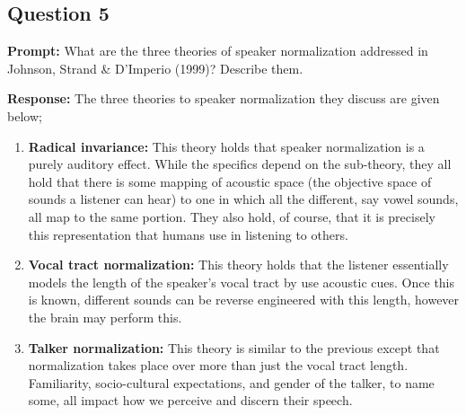 \documentclass{article}
\begin{document}
\subsection*{Question 5}
\noindent\textbf{Prompt:} What are the three theories of speaker normalization addressed in Johnson, Strand \& D'Imperio (1999)? Describe them.
\bigskip

\noindent\textbf{Response:} The three theories to speaker normalization they discuss are given below;
\begin{enumerate}
    \item \textbf{Radical invariance:} This theory holds that speaker normalization is a purely auditory effect. While the specifics depend on the sub-theory, they all hold that there is some mapping of acoustic space (the objective space of sounds a listener can hear) to one in which all the different, say vowel sounds, all map to the same portion. They also hold, of course, that it is precisely this representation that humans use in listening to others.
    \item \textbf{Vocal tract normalization:} This theory holds that the listener essentially models the length of the speaker's vocal tract by use acoustic cues. Once this is known, different sounds can be reverse engineered with this length, however the brain may perform this.
    \item \textbf{Talker normalization:} This theory is similar to the previous except that normalization takes place over more than just the vocal tract length. Familiarity, socio-cultural expectations, and gender of the talker, to name some, all impact how we perceive and discern their speech.
\end{enumerate}
\end{document}
